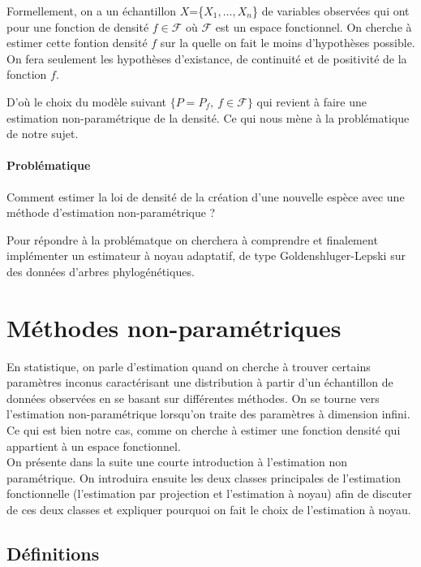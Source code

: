 \documentclass[
]{article}
\begin{document}
Formellement, on a un échantillon \(X\)=\{\(X_1,\dots,X_n\)\} de
variables observées qui ont pour une fonction de densité
\(f \in \mathcal F\) où \(\mathcal F\) est un espace fonctionnel. On
cherche à estimer cette fontion densité \(f\) sur la quelle on fait le
moins d'hypothèses possible. On fera seulement les hypothèses
d'existance, de continuité et de positivité de la fonction \(f\).

D'où le choix du modèle suivant \(\{P=P_f,~f\in \mathcal F\}\) qui
revient à faire une estimation non-paramétrique de la densité. Ce qui
nous mène à la problématique de notre sujet.

\paragraph{Problématique}

Comment estimer la loi de densité de la création d'une nouvelle espèce
avec une méthode d'estimation non-paramétrique ?

Pour répondre à la problématque on cherchera à comprendre et finalement
implémenter un estimateur à noyau adaptatif, de type
Goldenshluger-Lepski sur des données d'arbres phylogénétiques.

\newpage

\section{Méthodes non-paramétriques}


\hspace*{0.5cm} En statistique, on parle d'estimation quand on cherche à
trouver certains paramètres inconus caractérisant une distribution à
partir d'un échantillon de données observées en se basant sur
différentes méthodes. On se tourne vers l'estimation non-paramétrique
lorsqu'on traite des paramètres à dimension infini. Ce qui est bien
notre cas, comme on cherche à estimer une fonction densité qui
appartient à un espace fonctionnel.\\
\hspace*{0.5cm} On présente dans la suite une courte introduction à
l'estimation non paramétrique. On introduira ensuite les deux classes
principales de l'estimation fonctionnelle (l'estimation par projection
et l'estimation à noyau) afin de discuter de ces deux classes et
expliquer pourquoi on fait le choix de l'estimation à noyau.

\subsection{Définitions}
\end{document}
